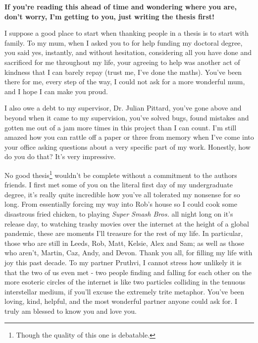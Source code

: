 

\begin{acknowledgements}      %

\setlength{\parindent}{17.62482pt}
\setlength{\parskip}{0.0pt plus 1.0pt}

\textbf{If you're reading this ahead of time and wondering where you are, don't worry, I'm getting to you, just writing the thesis first!}

I suppose a good place to start when thanking people in a thesis is to start with family.
To my mum, when I asked you to for help funding my doctoral degree, you said yes, instantly, and without hesitation, considering all you have done and sacrificed for me throughout my life, your agreeing to help was another act of kindness that I can barely repay (trust me, I've done the maths).
You've been there for me, every step of the way, I could not ask for a more wonderful mum, and I hope I can make you proud.

I also owe a debt to my supervisor, Dr. Julian Pittard, you've gone above and beyond when it came to my supervision, you've solved bugs, found mistakes and gotten me out of a jam more times in this project than I can count.
I'm still amazed how you can rattle off a paper or three from memory when I've come into your office asking questions about a very specific part of my work.
Honestly, how do you do that? It's very impressive.

No good thesis\footnote{Though the quality of this one is debatable.} wouldn't be complete without a commitment to the authors friends.
I first met some of you on the literal first day of my undergraduate degree, it's really quite incredible how you've all tolerated my nonsense for so long.
From essentially forcing my way into Rob's house so I could cook some disastrous fried chicken, to playing \textit{Super Smash Bros.} all night long on it's release day, to watching trashy movies over the internet at the height of a global pandemic, these are moments I'll treasure for the rest of my life.
In particular, those who are still in Leeds, Rob, Matt, Kelsie, Alex and Sam; as well as those who aren't, Martin, Caz, Andy, and Devon.
Thank you all, for filling my life with joy this past decade.
To my partner Pruthvi, I cannot stress how unlikely it is that the two of us even met - two people finding and falling for each other on the more esoteric circles of the internet is like two particles colliding in the tenuous interstellar medium, if you'll excuse the extremely trite metaphor.
You've been loving, kind, helpful, and the most wonderful partner anyone could ask for.
I truly am blessed to know you and love you.


\end{acknowledgements}
